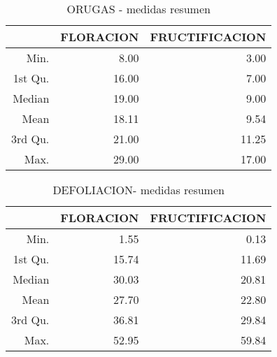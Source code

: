 \begin{table}[ht]
\centering
\begin{tabular}{rrr}
  \hline
 & FLORACION & FRUCTIFICACION \\ 
  \hline
Min. & 8.00 & 3.00 \\ 
  1st Qu. & 16.00 & 7.00 \\ 
  Median & 19.00 & 9.00 \\ 
  Mean & 18.11 & 9.54 \\ 
  3rd Qu. & 21.00 & 11.25 \\ 
  Max. & 29.00 & 17.00 \\ 
   \hline
\end{tabular}
\caption{ORUGAS - medidas resumen} 
\label{table:summary_orugas}
\end{table}
\begin{table}[ht]
\centering
\begin{tabular}{rrr}
  \hline
 & FLORACION & FRUCTIFICACION \\ 
  \hline
Min. & 1.55 & 0.13 \\ 
  1st Qu. & 15.74 & 11.69 \\ 
  Median & 30.03 & 20.81 \\ 
  Mean & 27.70 & 22.80 \\ 
  3rd Qu. & 36.81 & 29.84 \\ 
  Max. & 52.95 & 59.84 \\ 
   \hline
\end{tabular}
\caption{DEFOLIACION- medidas resumen} 
\label{table:summary_defoliacion}
\end{table}
